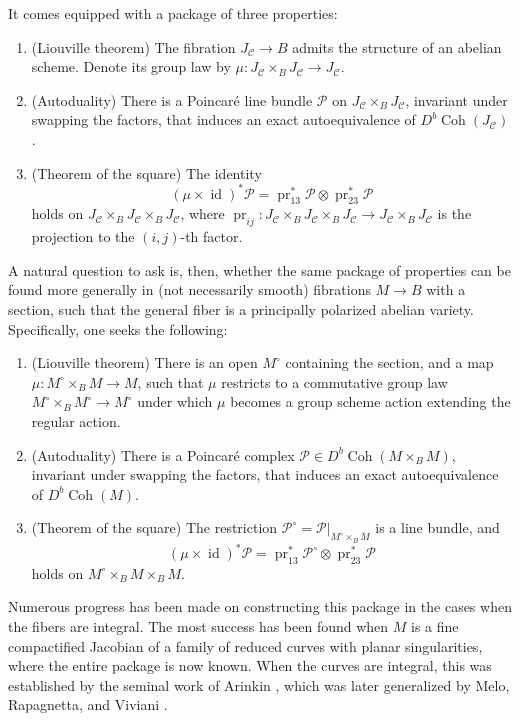\documentclass{amsart}
\theoremstyle{plain}
\theoremstyle{definition}
\theoremstyle{remark}
\begin{document}
    It comes equipped with a package of three properties:
    \begin{enumerate}
        \item (Liouville theorem) The fibration $J_{\mathcal C}\to B$ admits the structure of an abelian scheme.
        Denote its group law by $\mu:J_{\mathcal C}\times_BJ_{\mathcal  C}\to J_{\mathcal C}$.
        \item (Autoduality) There is a Poincar\'e line bundle $\mathcal P$ on $J_{\mathcal C}\times_B J_{\mathcal C}$, invariant under swapping the factors, that induces an exact autoequivalence of $D^b\operatorname{Coh}(J_{\mathcal C})$.
        \item (Theorem of the square) The identity
        \[(\mu\times\operatorname{id})^\ast\mathcal P=\operatorname{pr}_{13}^\ast\mathcal P\otimes\operatorname{pr}_{23}^\ast\mathcal P\]
        holds on $J_{\mathcal C}\times_BJ_{\mathcal C}\times_BJ_{\mathcal C}$, where $\operatorname{pr}_{ij}:J_{\mathcal C}\times_BJ_{\mathcal C}\times_BJ_{\mathcal C}\to J_{\mathcal C}\times_BJ_{\mathcal C}$ is the projection to the $(i,j)$-th factor.
    \end{enumerate}
    A natural question to ask is, then, whether the same package of properties can be found more generally in (not necessarily smooth) fibrations $M\to B$ with a section, such that the general fiber is a principally polarized abelian variety.
    Specifically, one seeks the following:
    \begin{enumerate}
        \item (Liouville theorem) There is an open $M^\circ$ containing the section, and a map $\mu:M^\circ\times_BM\to M$, such that $\mu$ restricts to a commutative group law $M^\circ \times_BM^\circ\to M^\circ$ under which $\mu$ becomes a group scheme action extending the regular action.
        \item (Autoduality) There is a Poincar\'e complex $\mathcal P\in D^b\operatorname{Coh}(M\times_BM)$, invariant under swapping the factors, that induces an exact autoequivalence of $D^b\operatorname{Coh}(M)$.
        \item (Theorem of the square) The restriction $\mathcal P^\circ =\mathcal P|_{M^\circ\times_BM}$ is a line bundle, and
        \[(\mu\times\operatorname{id})^\ast\mathcal P=\operatorname{pr}_{13}^\ast\mathcal P^\circ\otimes\operatorname{pr}_{23}^\ast\mathcal P\]
        holds on $M^\circ\times_BM\times_BM$.
    \end{enumerate}
    Numerous progress has been made on constructing this package in the cases when the fibers are integral.
    The most success has been found when $M$ is a fine compactified Jacobian of a family of reduced curves with planar singularities, where the entire package is now known.
    When the curves are integral, this was established by the seminal work of Arinkin \cite{arinkin}, which was later generalized by Melo, Rapagnetta, and Viviani \cite{mrv1} \cite{mrv2}.
\end{document}
